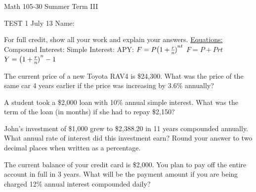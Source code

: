 \documentclass[11pt,epsfig]{article}
\begin{document}
Math 105-30 Summer Term III 

TEST 1 July 13 \hspace{1.9in} {Name:} {\underline {\hspace{3.5in}}}
\vspace{2pc}

For full credit, show all your work and explain your answers.
\newline
\newline
\underline{Equations:}
\newline
Compound Interest: \hspace{2.5cm}  Simple Interest:   \hspace{2.5cm} APY:
\newline
$F=P\big{(1+\frac{r}{n})}^{nt}$ 
\hspace{3.5cm} $F=P+Prt$
\hspace{3.0cm} $Y=\big{(1+\frac{r}{n})}^{n}-1$

\vspace{2pc}

\begin{problem}{12}
The current price of a new Toyota RAV4 is \$24,300. What was the price of the same car 4 years earlier if the price was increasing by 3.6\% annually? 
\vfill
\end{problem}

\begin{problem}{12}
A student took a \$2,000 loan with 10\% annual simple interest. What was the term of the loan (in months) if she had to repay \$2,150?
\vfill
\end{problem}

\newpage

\begin{problem}{12}
John's investment of \$1,000 grew to \$2,388.20 in 11 years compounded annually. What annual rate of interest did this investment earn? Round your answer to two decimal places when written as a percentage.

\vfill
\end{problem}


\begin{problem}{13}
The current balance of your credit card is \$2,000. You plan to pay off the entire account in full in 3 years. What will be the payment amount if you are being charged 12\% annual interest compounded daily?

\vfill
\end{problem}
\end{document}
